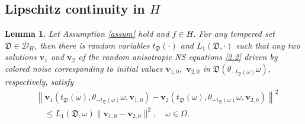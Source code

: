 \documentclass{elsarticle}
\newtheorem{lemma}[theorem]{Lemma}
\theoremstyle{definition}
\numberwithin{equation}{section}
\newcommand{\D}{\mathcal{D}}
\begin{document}
\subsection{Lipschitz continuity in $H$}


\begin{lemma}\label{lemma5.0}
 Let Assumption \ref{assum} hold and $f\in H$.
 For  any tempered set $\mathfrak D\in \D_H $, then there is random variables $t_{\mathfrak D}(\cdot)$ and $L_1(\mathfrak D,\cdot) $ such that any
 two solutions $\textbf{v}_1$ and $\textbf{v}_2$ of the random anisotropic  NS equations \eqref{2.2} driven by colored noise corresponding to initial values  $\textbf{v}_{1,0},$ $\textbf{v}_{2,0}$ in $ \mathfrak D( \theta_{-t_{\mathfrak D}(\omega)}\omega),$   respectively,  satisfy
\begin{align*}
 & \left \| \textbf{v}_1 \! \left ( t_{\mathfrak D} (\omega) ,\theta_{-t_{\mathfrak D}(\omega)}\omega,  \textbf{v}_{1,0}\right)
 - \textbf{v}_2 \! \left ( t_{\mathfrak D} (\omega) ,\theta_{-t_{\mathfrak D}(\omega)}\omega, \textbf{v}_{2,0}\right) \right \|^2  \\[0.8ex]
 &\quad
 \leq L_1({\mathfrak D}, \omega) \|\textbf{v}_{1,0}-\textbf{v}_{2,0}\|^2  ,\quad \omega \in \Omega.
\end{align*}

\end{lemma}
\end{document}
